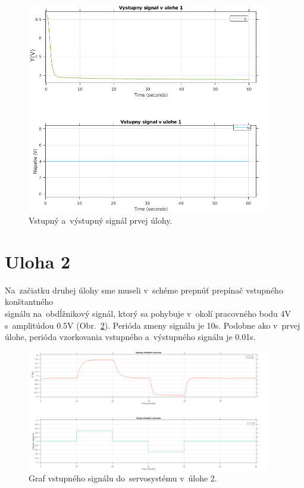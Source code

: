 \documentclass{article}
\begin{document}
\begin{figure}[!htbp]
	\begin{center}
		\includegraphics[width=0.95\textwidth]{include/uloha1_graf.png}
	\end{center}
	\caption{Vstupný a~výstupný signál prvej úlohy.}
	\label{fig:uloha1_graf}
\end{figure}

\clearpage

\section{Uloha 2}
\label{subsec:u2}

Na~začiatku druhej úlohy sme museli v~schéme prepnúť prepínač vstupného konštantného\\
signálu na~obdĺžnikový signál, ktorý sa pohybuje v~okolí pracovného bodu 4V s~amplitúdou 0.5V
(Obr.~\ref{fig:vstup2}). Perióda zmeny signálu je 10s. Podobne ako v~prvej úlohe,
perióda vzorkovania vstupného a~výstupného signálu je 0.01s.

\begin{figure}[!htbp]
	\begin{center}
		\includegraphics[width=0.95\textwidth]{include/vstup2_2.png}
	\end{center}
	\caption{Graf vstupného signálu do~servosystému v~úlohe 2.}
	\label{fig:vstup2}
\end{figure}
\end{document}
